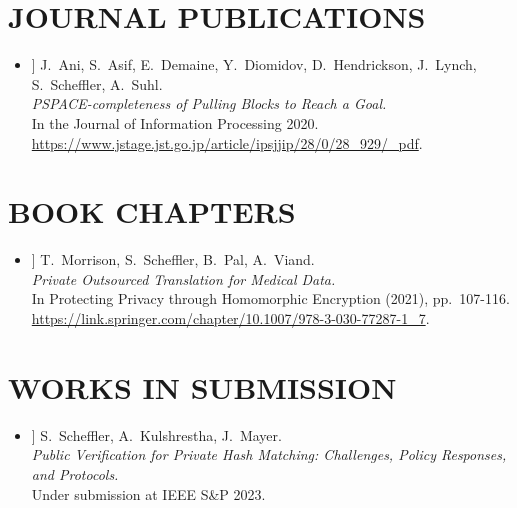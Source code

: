 \documentclass{res}
\begin{document}
\begin{resume}
\section{JOURNAL PUBLICATIONS}
\vspace{0.25in}

\newcommand{\pullingblocksJIP}{[11]\xspace}

\begin{itemize}
\item[\pullingblocksJIP] J.~Ani, S.~Asif, E.~Demaine, Y.~Diomidov, D.~Hendrickson, J.~Lynch, S.~Scheffler, A.~Suhl. \\
\emph{PSPACE-completeness of Pulling Blocks to Reach a Goal.} \\
In the Journal of Information Processing 2020.\\
\url{https://www.jstage.jst.go.jp/article/ipsjjip/28/0/28_929/_pdf}.
\end{itemize}

\vspace{0.25in}

\section{BOOK CHAPTERS}
\vspace{0.25in}

\newcommand{\privateTranslation}{[12]\xspace}

\begin{itemize}
\item[\privateTranslation] T.~Morrison, S.~Scheffler, B.~Pal, A.~Viand. \\
\emph{Private Outsourced Translation for Medical Data.} \\
In Protecting Privacy through Homomorphic Encryption (2021), pp.~107-116. \\
\url{https://link.springer.com/chapter/10.1007/978-3-030-77287-1_7}.
\end{itemize}

\vspace{0.25in}

\section{WORKS IN SUBMISSION}
\vspace{0.25in}

\newcommand{\csamimprovements}{[13]\xspace}
\newcommand{\eeesok}{[14]\xspace}

\begin{itemize}
\item[\csamimprovements] S.~Scheffler, A.~Kulshrestha, J.~Mayer. \\
\emph{Public Verification for Private Hash Matching: Challenges, Policy Responses, and Protocols.} \\
Under submission at IEEE S\&P 2023.


\end{itemize}
\end{resume}
\end{document}
